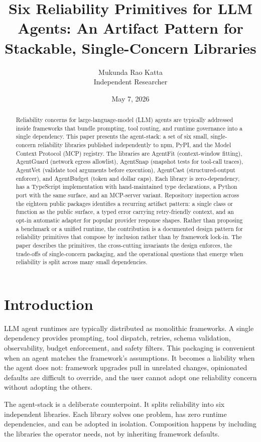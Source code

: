 \documentclass[11pt]{article}
\title{Six Reliability Primitives for LLM Agents: An Artifact Pattern for Stackable, Single-Concern Libraries}
\author{Mukunda Rao Katta\\Independent Researcher}
\date{May 7, 2026}
\begin{document}
\maketitle

\begin{abstract}
Reliability concerns for large-language-model (LLM) agents are typically addressed inside frameworks that bundle prompting, tool routing, and runtime governance into a single dependency. This paper presents the agent-stack: a set of six small, single-concern reliability libraries published independently to npm, PyPI, and the Model Context Protocol (MCP) registry. The libraries are AgentFit (context-window fitting), AgentGuard (network egress allowlist), AgentSnap (snapshot tests for tool-call traces), AgentVet (validate tool arguments before execution), AgentCast (structured-output enforcer), and AgentBudget (token and dollar caps). Each library is zero-dependency, has a TypeScript implementation with hand-maintained type declarations, a Python port with the same surface, and an MCP-server variant. Repository inspection across the eighteen public packages identifies a recurring artifact pattern: a single class or function as the public surface, a typed error carrying retry-friendly context, and an opt-in automatic adapter for popular provider response shapes. Rather than proposing a benchmark or a unified runtime, the contribution is a documented design pattern for reliability primitives that compose by inclusion rather than by framework lock-in. The paper describes the primitives, the cross-cutting invariants the design enforces, the trade-offs of single-concern packaging, and the operational questions that emerge when reliability is split across many small dependencies.
\end{abstract}
\section{Introduction}


LLM agent runtimes are typically distributed as monolithic frameworks. A single dependency provides prompting, tool dispatch, retries, schema validation, observability, budget enforcement, and safety filters. This packaging is convenient when an agent matches the framework's assumptions. It becomes a liability when the agent does not: framework upgrades pull in unrelated changes, opinionated defaults are difficult to override, and the user cannot adopt one reliability concern without adopting the others.

The agent-stack is a deliberate counterpoint. It splits reliability into six independent libraries. Each library solves one problem, has zero runtime dependencies, and can be adopted in isolation. Composition happens by including the libraries the operator needs, not by inheriting framework defaults.
\end{document}
